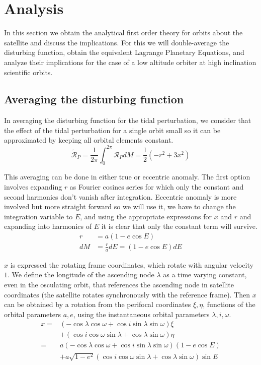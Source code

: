 \section{Analysis}
In this section we obtain the analytical first order theory for orbits about the satellite and discuss the implications. For this we will double-average the disturbing function, obtain the equivalent Lagrange Planetary Equations, and analyze their implications for the case of a low altitude orbiter at high inclination scientific orbits.

\subsection{Averaging the disturbing function}
In averaging the disturbing function for the tidal perturbation, we consider that the effect of the tidal perturbation for a single orbit small so it can be approximated by keeping all orbital elements constant.
\begin{equation}
\tilde{\mathcal{R}}_P = \frac{1}{2\pi} \int_0^{2\pi} \mathcal{R}_P dM =\frac{1}{2}(-r^2 + 3 x^2)
\end{equation}

This averaging can be done in either true or eccentric anomaly. The first option involves expanding $r$ as Fourier cosines series for which only the constant and second harmonics don't vanish after integration. Eccentric anomaly is more involved but more straight forward so we will use it, we have to change the integration variable to $E$, and using the appropriate expressions for $x$ and $r$ and expanding into harmonics of $E$ it is clear that only the constant term will survive. 
\begin{align}
r &= a (1 - e \cos E) \\
dM &= \frac{r}{a} dE = (1 - e \cos E) dE
\end{align}

$x$ is expressed the rotating frame coordinates, which rotate with angular velocity $1$. We define the longitude of the ascending node $\lambda$ as a time varying constant, even in the osculating orbit, that references the ascending node in satellite coordinates (the satellite rotates synchronously with the reference frame). Then $x$ can be obtained by a rotation from the perifocal coordinates $\xi, \eta$, functions of the orbital parameters $a,e$, using the instantaneous orbital parameters $\lambda, i, \omega$.
\begin{equation}
\begin{aligned}
x =& (-\cos\lambda \cos\omega + \cos i \sin\lambda \sin\omega) \xi \\
&+ (\cos i \cos\omega \sin\lambda + \cos\lambda \sin\omega) \eta \\
=& a (-\cos\lambda \cos\omega + \cos i \sin\lambda \sin\omega) (1 - e \cos E) \\
&+ a \sqrt{1-e^2} (\cos i \cos\omega \sin\lambda + \cos\lambda \sin\omega) \sin E
\end{aligned}
\end{equation}


